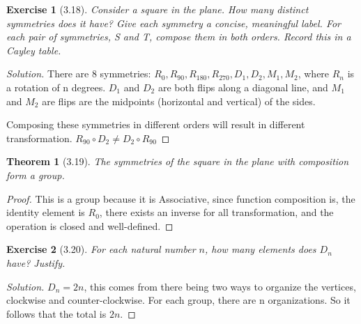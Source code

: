 \documentclass{article}
\newtheorem*{thm}{Theorem}
\newtheorem*{ex}{Exercise}
\newenvironment{solution}
  {\begin{proof}[Solution]}
  {\renewcommand{\qedsymbol}{}\end{proof}}
\begin{document}
\begin{ex}[3.18]
	Consider a square in the plane. How many distinct symmetries does
	it have? Give each symmetry a concise, meaningful label. For each
	pair of symmetries, S and T, compose them in both orders. Record
	this in a Cayley table. 
\end{ex}
\begin{solution}
	There are 8 symmetries: $R_0, R_{90}, R_{180}, R_{270}, D_1, D_2,
	M_1, M_2$, where $R_n$ is a rotation of n degrees. $D_1$ and $D_2$
	are both flips along a diagonal line, and $M_1$ and $M_2$ are flips
	are the midpoints (horizontal and vertical) of the sides.

	Composing these symmetries in different orders will result 
	in different transformation. $R_{90} \circ D_2 \neq D_2 \circ R_{90}$

\end{solution}

\begin{thm}[3.19]
	The symmetries of the square in the plane with composition
	form a group.
\end{thm}
\begin{proof}
	This is a group because it is Associative, since function
	composition is, the identity element is $R_0$, there exists
	an inverse for all transformation, and the operation is closed
	and well-defined. 
\end{proof}

\begin{ex}[3.20]
	For each natural number $n$, how many elements does $D_n$ have? 
	Justify.
\end{ex}
\begin{solution}
	$D_n = 2n$, this comes from there being two ways to organize the
	vertices, clockwise and counter-clockwise. For each group, there
	are n organizations. So it follows that the total is $2n$. 
\end{solution}
\end{document}
